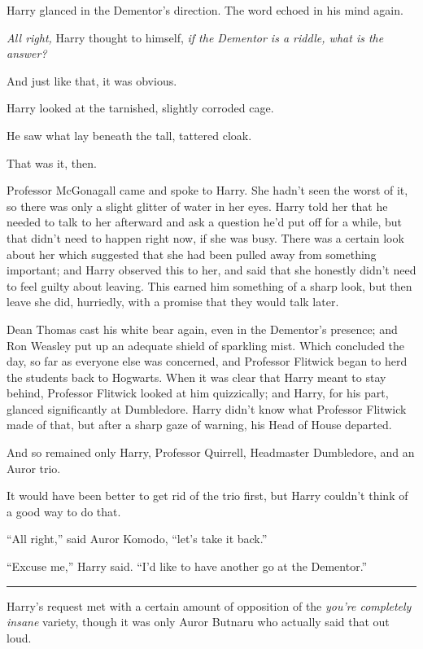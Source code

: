 Harry glanced in the Dementor's direction. The word echoed in his mind
again.

\emph{All right,} Harry thought to himself, \emph{if the Dementor is a
riddle, what is the answer?}

And just like that, it was obvious.

Harry looked at the tarnished, slightly corroded cage.

He saw what lay beneath the tall, tattered cloak.

That was it, then.

Professor McGonagall came and spoke to Harry. She hadn't seen the worst
of it, so there was only a slight glitter of water in her eyes. Harry
told her that he needed to talk to her afterward and ask a question he'd
put off for a while, but that didn't need to happen right now, if she
was busy. There was a certain look about her which suggested that she
had been pulled away from something important; and Harry observed this
to her, and said that she honestly didn't need to feel guilty about
leaving. This earned him something of a sharp look, but then leave she
did, hurriedly, with a promise that they would talk later.

Dean Thomas cast his white bear again, even in the Dementor's presence;
and Ron Weasley put up an adequate shield of sparkling mist. Which
concluded the day, so far as everyone else was concerned, and Professor
Flitwick began to herd the students back to Hogwarts. When it was clear
that Harry meant to stay behind, Professor Flitwick looked at him
quizzically; and Harry, for his part, glanced significantly at
Dumbledore. Harry didn't know what Professor Flitwick made of that, but
after a sharp gaze of warning, his Head of House departed.

And so remained only Harry, Professor Quirrell, Headmaster Dumbledore,
and an Auror trio.

It would have been better to get rid of the trio first, but Harry
couldn't think of a good way to do that.

``All right,'' said Auror Komodo, ``let's take it back.''

``Excuse me,'' Harry said. ``I'd like to have another go at the
Dementor.''

\begin{center}\rule{3in}{0.4pt}\end{center}

Harry's request met with a certain amount of opposition of the
\emph{you're completely insane} variety, though it was only Auror
Butnaru who actually said that out loud.

